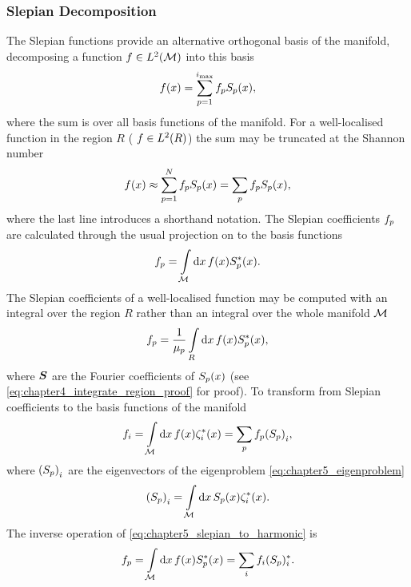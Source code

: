 \subsubsection{Slepian Decomposition}

The Slepian functions provide an alternative orthogonal basis of the manifold, decomposing a function \(f \in L^{2}(\mathcal{M})\) into this basis
%
\begin{equation}
	f(x)
	= \sum\limits_{p=1}^{i_{\text{max}}} {f}_{p} {S}_{p}(x),
\end{equation}
%
where the sum is over all basis functions of the manifold.
For a well-localised function in the region \(R\) (\ie{} \(f \in L^{2}(R)\)) the sum may be truncated at the Shannon number
%
\begin{equation}
	f(x)
	\approx \sum\limits_{p=1}^{N} {f}_{p} {S}_{p}(x)
	= \displaystyle\sum\limits_{p} {f}_{p} {S}_{p}(x),
\end{equation}
%
where the last line introduces a shorthand notation.
The Slepian coefficients \({f}_{p}\) are calculated through the usual projection on to the basis functions
%
\begin{equation}
	{f}_{p}
	= \displaystyle\int\limits_{\mathcal{M}} \dd{x} f(x) {S}_{p}^{\ast}(x).
\end{equation}
%
The Slepian coefficients of a well-localised function may be computed with an integral over the region \(R\) rather than an integral over the whole manifold \(\mathcal{M}{}\)
%
\begin{equation}
	{f}_{p}
	= \frac{1}{{\mu}_{p}} \displaystyle\int\limits_{R} \dd{x} f(x) {S}_{p}^{\ast}(x),
\end{equation}
%
where \(\vb*{S}\) are the Fourier coefficients of \({S}_{p}(x)\) (see \cref{eq:chapter4_integrate_region_proof} for proof).
To transform from Slepian coefficients to the basis functions of the manifold
%
\begin{equation}\label{eq:chapter5_slepian_to_harmonic}
	f_{i}
	= \displaystyle\int\limits_{\mathcal{M}} \dd{x} f(x) \zeta_{i}^{\ast}(x)
	= \displaystyle\sum\limits_{p} {f}_{p} {({S}_{p})}_{i},
\end{equation}
%
where \({({S}_{p})}_{i}\) are the eigenvectors of the eigenproblem \cref{eq:chapter5_eigenproblem}
%
\begin{equation}
	{({S}_{p})}_{i}
	= \displaystyle\int\limits_{\mathcal{M}} \dd{x} {S}_{p}(x) \zeta_{i}^{\ast}(x).
\end{equation}
%
The inverse operation of \cref{eq:chapter5_slepian_to_harmonic} is
%
\begin{equation}
	{f}_{p}
	= \displaystyle\int\limits_{\mathcal{M}} \dd{x} f(x) {S}_{p}^{\ast}(x)
	= \displaystyle\sum\limits_{i} f_{i} ({S}_{p})^{\ast}_{i}.
\end{equation}

